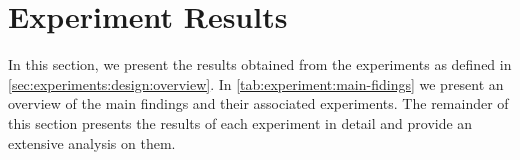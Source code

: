 \section{Experiment Results}
\label{sec:experiments:results}




In this section, we present the results obtained from the experiments as defined in \cref{sec:experiments:design:overview}. In \cref{tab:experiment:main-fidings} we present an overview of the main findings and their associated experiments. The remainder of this section presents the results of each experiment in detail and provide an extensive analysis on them.









    
    
